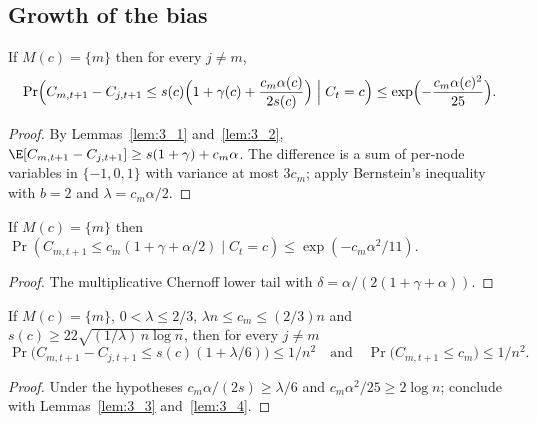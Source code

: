 \subsection{Growth of the bias}

\begin{lemma}\label{lem:3_3}
  \leanok
  If $M(c) = \{m\}$ then for every $j \ne m$,
  \[
    \Pr\Bigl(C_{m,t+1} - C_{j,t+1} \le s(c)\Bigl(1 + \gamma(c)
      + \frac{c_m\alpha(c)}{2s(c)}\Bigr) \Bigm| C_t = c\Bigr)
      \le \exp\Bigl(-\frac{c_m\alpha(c)^2}{25}\Bigr).
  \]
\end{lemma}

\begin{proof}
  By Lemmas~\ref{lem:3_1} and~\ref{lem:3_2},
  $\E[C_{m,t+1} - C_{j,t+1}] \ge s(1+\gamma) + c_m\alpha$. The difference is
  a sum of per-node variables in $\{-1,0,1\}$ with variance at most $3c_m$;
  apply Bernstein's inequality with $b = 2$ and $\lambda = c_m\alpha/2$.
\end{proof}

\begin{lemma}[Lemma 3.4]\label{lem:3_4}
  \leanok
  If $M(c) = \{m\}$ then
  $\Pr(C_{m,t+1} \le c_m(1 + \gamma + \alpha/2) \mid C_t = c)
  \le \exp(-c_m\alpha^2/11)$.
\end{lemma}

\begin{proof}
  The multiplicative Chernoff lower tail with
  $\delta = \alpha/(2(1 + \gamma + \alpha))$.
\end{proof}

\begin{lemma}\label{lem:3_5}
  \leanok
  If $M(c) = \{m\}$, $0 < \lambda \le 2/3$, $\lambda n \le c_m \le (2/3)n$
  and $s(c) \ge 22\sqrt{(1/\lambda)\,n\log n}$, then for every $j \ne m$
  \[
    \Pr\bigl(C_{m,t+1} - C_{j,t+1} \le s(c)(1 + \lambda/6)\bigr) \le 1/n^2
    \quad\text{and}\quad
    \Pr\bigl(C_{m,t+1} \le c_m\bigr) \le 1/n^2.
  \]
\end{lemma}

\begin{proof}
  Under the hypotheses $c_m\alpha/(2s) \ge \lambda/6$ and
  $c_m\alpha^2/25 \ge 2\log n$; conclude with Lemmas~\ref{lem:3_3}
  and~\ref{lem:3_4}.
\end{proof}

